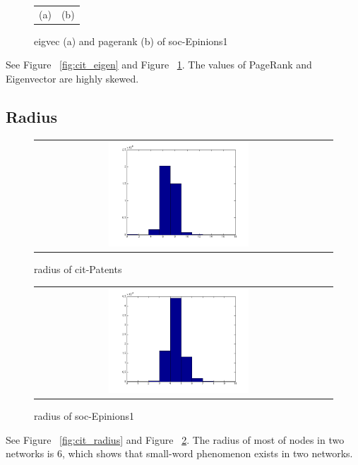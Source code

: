 \begin{figure}[htbf]
\begin{center}
\begin{tabular}{cc}
    (a) & (b) 
\end{tabular}
\caption{ eigvec (a) and pagerank (b) of soc-Epinions1}
\label{fig:soc_eigen}
\end{center}
\end{figure}

See Figure ~\ref{fig:cit_eigen}  and Figure ~\ref{fig:soc_eigen}. The values of PageRank and Eigenvector are highly skewed.

\subsection{Radius}

\begin{figure}[htbf]
\begin{center}
\begin{tabular}{cc}
     \includegraphics[width=0.5\textwidth]{FIG/cit_result/radius.png} \\
\end{tabular}
\caption{radius of cit-Patents}
\label{fig:cit_radius}
\begin{tabular}{cc}
     \includegraphics[width=0.5\textwidth]{FIG/soc_result/radius.png} \\
\end{tabular}
\caption{radius of soc-Epinions1}
\label{fig:soc_radius}
\end{center}
\end{figure}

See Figure ~\ref{fig:cit_radius} and Figure ~\ref{fig:soc_radius}. The radius of most of nodes in two networks is 6, which shows that small-word phenomenon exists in two networks. 
